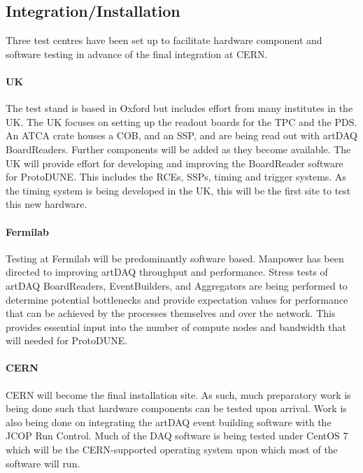 

\subsection{Integration/Installation}

Three test centres have been set up to facilitate hardware component and 
software testing in advance of the final integration at CERN.  
\paragraph{UK}
The test stand is based in Oxford but includes effort from many institutes 
in the UK.  The UK focuses on setting up the readout boards for the TPC and the 
PDS.  An ATCA crate houses a COB, and an SSP, and are being read out with
artDAQ BoardReaders.  Further components will be added as they become available.
The UK will provide effort for developing and improving
the BoardReader software for ProtoDUNE.  This includes the RCEs, SSPs, timing and
trigger systems.  As the timing system is being developed in the UK, this 
will be the first site to test this new hardware.
\paragraph{Fermilab}
Testing at Fermilab will be predominantly software based.  Manpower has been
directed to improving artDAQ throughput and performance.  Stress tests of artDAQ
BoardReaders, EventBuilders, and Aggregators are being performed to determine
potential bottlenecks and provide expectation values for performance that can be
achieved by the processes themselves and over the network.  This provides essential
input into the number of compute nodes and bandwidth that will needed for ProtoDUNE.
\paragraph{CERN}
CERN will become the final installation site.  As such, much preparatory work
is being done such that hardware components can be tested upon arrival.  Work is
also being done on integrating the artDAQ event building software with the JCOP
Run Control.  Much of the DAQ software is being tested under CentOS 7 which 
will be the CERN-supported operating system upon which most of the software will run.


